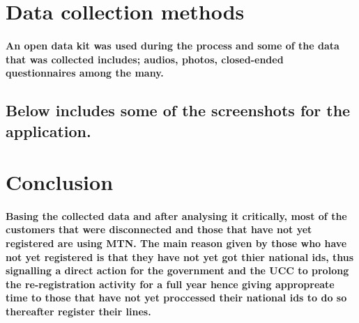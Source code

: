 \documentclass[12pt]{report}
\begin{document}
\section{Data collection methods}
\paragraph{An open data kit was used during the process and some of the data that was collected includes; audios, photos, closed-ended questionnaires among the many.}

\subsection{Below includes some of the screenshots for the application.}

\section{Conclusion}
\paragraph{Basing the collected data and after analysing it critically, most of the customers that were disconnected and those that have not yet registered are using MTN. The main reason given by those who have not yet registered is that they have not yet got thier national ids, thus signalling a direct action for the government and the UCC to prolong the re-registration activity for a full year hence giving appropreate time to those that have not yet proccessed their national ids to do so thereafter register their lines. }
\end{document}
